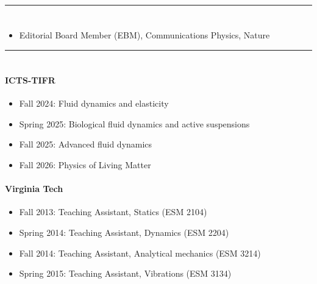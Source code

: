 \documentclass[10pt]{res} %
\begin{document}
\begin{resume}
\vspace*{-8mm}
\noindent\rule{\textwidth}{0.6pt}
\vspace*{-10mm}
\section{}
\vspace*{5mm}
\begin{itemize}
	\item Editorial Board Member (EBM), Communications Physics, Nature
\end{itemize} 

\vspace*{-2mm}
\noindent\rule{\textwidth}{0.6pt}
\vspace*{-10mm}
\section{}
\paragraph{ICTS-TIFR}
\begin{itemize}
		\vspace*{2mm}
		\item Fall 2024: Fluid dynamics and elasticity
		\item Spring 2025: Biological fluid dynamics and active suspensions
		\item Fall 2025: Advanced fluid dynamics
		\item Fall 2026: Physics of Living Matter
\end{itemize} 

\paragraph{Virginia Tech} 
\begin{itemize}
	\vspace*{2mm}
	\item Fall 2013: Teaching Assistant, Statics  (ESM 2104)
	\item Spring 2014: Teaching Assistant, Dynamics (ESM 2204)
	\item Fall 2014: Teaching Assistant, Analytical mechanics (ESM 3214)
	\item Spring 2015: Teaching Assistant, Vibrations (ESM 3134)
\end{itemize}


\end{resume}
\end{document}
